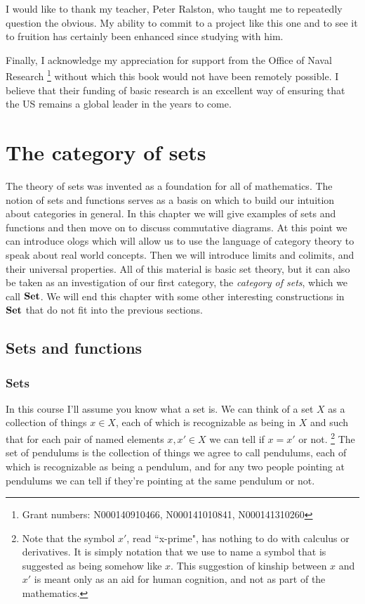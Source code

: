 \documentclass{book}
\def\Set{{\bf Set}}
\theoremstyle{remark}
\theoremstyle{definition}
\begin{document}
I would like to thank my teacher, Peter Ralston, who taught me to repeatedly question the obvious. My ability to commit to a project like this one and to see it to fruition has certainly been enhanced since studying with him.

Finally, I acknowledge my appreciation for support from the Office of Naval Research
\footnote{Grant numbers: N000140910466, N000141010841, N000141310260} 
without which this book would not have been remotely possible. I believe that their funding of basic research is an excellent way of ensuring that the US remains a global leader in the years to come.



\chapter{The category of sets}\label{chap:sets}

The theory of sets was invented as a foundation for all of mathematics. The notion of sets and functions serves as a basis on which to build our intuition about categories in general. In this chapter we will give examples of sets and functions and then move on to discuss commutative diagrams. At this point we can introduce ologs which will allow us to use the language of category theory to speak about real world concepts. Then we will introduce limits and colimits, and their universal properties. All of this material is basic set theory, but it can also be taken as an investigation of our first category, the {\em category of sets}, which we call $\Set$. We will end this chapter with some other interesting constructions in $\Set$ that do not fit into the previous sections.


\section{Sets and functions} 


\subsection{Sets}

In this course I'll assume you know what a set is. We can think of a set $X$ as a collection of things $x\in X$, each of which is recognizable as being in $X$ and such that for each pair of named elements $x,x'\in X$ we can tell if $x=x'$ or not.
\footnote{Note that the symbol $x'$, read ``x-prime", has nothing to do with calculus or derivatives. It is simply notation that we use to name a symbol that is suggested as being somehow like $x$. This suggestion of kinship between $x$ and $x'$ is meant only as an aid for human cognition, and not as part of the mathematics.}
The set of pendulums is the collection of things we agree to call pendulums, each of which is recognizable as being a pendulum, and for any two people pointing at pendulums we can tell if they're pointing at the same pendulum or not. 
\end{document}
